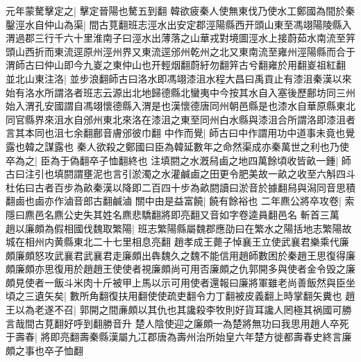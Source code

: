 元年蒙驁擊定之|{
	擊定晉陽也驁五到翻}
韓欲疲秦人使無東伐乃使水工鄭國為間於秦鑿涇水自仲山為渠|{
	間古莧翻班志涇水出安定郡涇陽縣西开頭山東至馮翊陽陵縣入渭過郡三行千六十里淮南子曰涇水出薄落之山華戎對境圖涇水上接蔚茹水南流至笄頭山西折而東流逕原州涇州界又東流逕邠州乾州之北又東南流至雍州涇陽縣而合于渭師古曰仲山即今九嵏之東仲山也开輕烟翻蔚紆勿翻笄古兮翻雍於用翻嵏祖紅翻}
並北山東注洛|{
	並步浪翻師古曰洛水即馮翊漆沮水程大昌曰禹貢止有漆沮秦漢以來始有洛水所謂洛者班志云源出北地歸德縣北蠻夷中今按其水自入塞後歷鄜坊同三州始入渭孔安國謂自馮翊懷德縣入渭是也漢懷德唐同州朝邑縣是也漆水自華原縣東北同官縣界來沮水自邠州東北來洛在漆沮之東至同州白水縣與漆沮合所謂洛即漆沮者言其本同也沮七余翻鄜音膚邠彼巾翻}
中作而覺|{
	師古曰中作謂用功中道事未竟也覺露也韓之謀露也}
秦人欲殺之鄭國曰臣為韓延數年之命然渠成亦秦萬世之利也乃使卒為之|{
	臣為于偽翻卒子恤翻終也}
注填閼之水漑舄鹵之地四萬餘頃收皆畝一鍾|{
	師古曰注引也填閼謂壅泥也言引淤濁之水灌鹹鹵之田更令肥美故一畝之收至六斛四斗杜佑曰古者百步為畝秦漢以降即二百四十步為畝閼讀曰淤音於據翻舄與潟同音思積翻鹵也鹵亦作滷音郎古翻鹹滷}
關中由是益富饒|{
	饒有餘裕也}
二年麃公將卒攻卷|{
	索隱曰麃邑名麃公史失其姓名麃悲驕翻將即亮翻又音如字卷逵員翻邑名}
斬首三萬　趙以廉頗為假相國伐魏取繁陽|{
	班志繁陽縣屬魏郡應劭曰在繁水之陽括地志繁陽故城在相州内黄縣東北二十七里相息亮翻}
趙孝成王薨子悼襄王立使武襄君樂乘代廉頗廉頗怒攻武襄君武襄君走廉頗出犇魏久之魏不能信用趙師數困於秦趙王思復得廉頗廉頗亦思復用於趙趙王使使者視廉頗尚可用否廉頗之仇郭開多與使者金令毁之廉頗見使者一飯斗米肉十斤被甲上馬以示可用使者還報曰廉將軍雖老尚善飯然與臣坐頃之三遺矢矣|{
	數所角翻復扶用翻使使疏吏翻令力丁翻被皮義翻上時掌翻矢糞也}
趙王以為老遂不召|{
	郭開之間亷頗以其仇也其讒殺李牧則好貨耳讒人罔極其祸國可勝言哉間古莧翻好呼到翻勝音升}
楚人陰使迎之廉頗一為楚將無功曰我思用趙人卒死于壽春|{
	將即亮翻壽秦縣漢屬九冮郡唐為壽州治所始皇六年楚方徙都壽春史終言廉頗之事也卒子恤翻}


